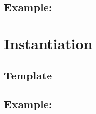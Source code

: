 \documentclass{article}
\begin{document}
\begin{spacing}{1.1}
\subsection{Example: }

\section{Instantiation}

\subsection{Template}

\subsection{Example: }


\end{spacing}
\end{document}
